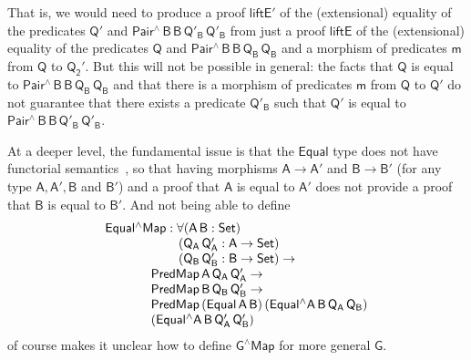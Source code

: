 \documentclass[sigplan,10pt]{acmart}
\begin{document}
That is, we would need to produce a proof $\mathsf{liftE'}$ of the
(extensional) equality of the predicates $\mathsf{Q'}$ and
$\mathsf{Pair^{\wedge}\,B\,B\,Q'_B\,Q'_B}$ from just a proof
$\mathsf{liftE}$ of the (extensional) equality of the predicates
$\mathsf{Q}$ and $\mathsf{Pair^{\wedge}\,B\,B\,Q_B\,Q_B}$ and a
morphism of predicates $\mathsf{m}$ from $\mathsf{Q}$ to
$\mathsf{Q_2'}$.
But this will not be possible in general: the facts that $\mathsf{Q}$
is equal to $\mathsf{Pair^{\wedge}\,B\,B\,Q_B\,Q_B}$ and that there is
a morphism of predicates $\mathsf{m}$ from $\mathsf{Q}$ to
$\mathsf{Q'}$ do not guarantee that there exists a predicate
$\mathsf{Q'_B}$ such that $\mathsf{Q'}$ is equal to
$\mathsf{Pair^{\wedge}\,B\,B\,Q'_B\,Q'_B}$.

At a deeper level, the fundamental issue is that the $\mathsf{Equal}$
type does not have functorial semantics~\cite{jg21}, so that having
morphisms $\mathsf{A \to A'}$ and $\mathsf{B \to B'}$ (for any type
$\mathsf{A, A', B}$ and $\mathsf{B'}$) and a proof that $\mathsf{A}$
is equal to $\mathsf{A'}$ does not provide a proof that $\mathsf{B}$
is equal to $\mathsf{B'}$. And not being able to define
\[\begin{array}{l}
\mathsf{Equal^\wedge Map : \forall (A\, B : Set)}\\
\hspace*{0.8in}\mathsf{(Q_A\, Q_A' : A \to Set)}\\
\hspace*{0.8in}\mathsf{(Q_B\, Q_B' : B \to Set) \to}\\
\hspace*{0.5in}\mathsf{PredMap\,A\,Q_A\,Q_A' \to}\\
\hspace*{0.5in}\mathsf{PredMap\,B\,Q_B\,Q_B' \to}\\
\hspace*{0.5in}\mathsf{PredMap\,(Equal\,A\,B)\,(Equal^\wedge
  A\,B\,Q_A\,Q_B)}\\
\hspace*{0.5in}\mathsf{(Equal^\wedge A\,B\,Q_A'\,Q_B')}
\end{array}\]
of course makes it unclear how to define $\mathsf{G^\wedge Map}$ for
more general $\mathsf{G}$.
\end{document}
